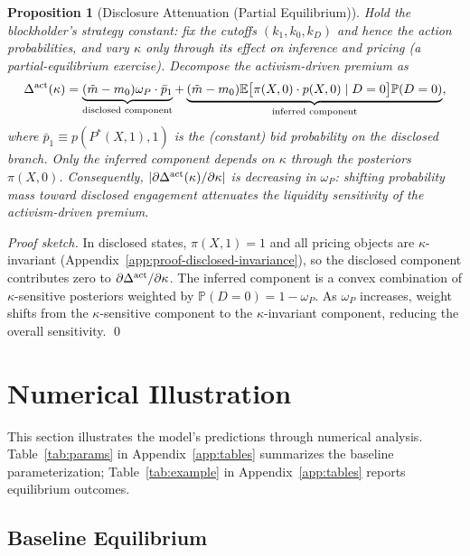 \documentclass[11pt]{article}
\newtheorem{proposition}{Proposition}
\newcommand{\E}{\mathbb{E}}
\newcommand{\PP}{\mathbb{P}}
\newcommand{\1}{\mathbf{1}}
\begin{document}
\begin{proposition}[Disclosure Attenuation (Partial Equilibrium)]
\label{prop:disclosure-attenuation}
Hold the blockholder's strategy constant: fix the cutoffs $(k_1,k_0,k_D)$ and hence the action probabilities, and vary $\kappa$ only through its effect on inference and pricing (a partial-equilibrium exercise). Decompose the activism-driven premium as
\[
\Delta^{\textup{act}}(\kappa) = \underbrace{(\tilde{m}-m_0)\omega_P \cdot \bar{p}_1}_{\text{disclosed component}} + \underbrace{(\tilde{m}-m_0)\E\big[\pi(X,0)\cdot p(X,0) \mid D=0\big]\PP(D=0)}_{\text{inferred component}},
\]
where $\bar{p}_1 \equiv p(P^*(X,1),1)$ is the (constant) bid probability on the disclosed branch. Only the inferred component depends on $\kappa$ through the posteriors $\pi(X,0)$. Consequently, $|\partial \Delta^{\textup{act}}(\kappa)/\partial\kappa|$ is decreasing in $\omega_P$: shifting probability mass toward disclosed engagement attenuates the liquidity sensitivity of the activism-driven premium.
\end{proposition}

\textit{Proof sketch.} In disclosed states, $\pi(X,1)=1$ and all pricing objects are $\kappa$-invariant (Appendix~\ref{app:proof-disclosed-invariance}), so the disclosed component contributes zero to $\partial\Delta^{\textup{act}}/\partial\kappa$. The inferred component is a convex combination of $\kappa$-sensitive posteriors weighted by $\PP(D=0)=1-\omega_P$. As $\omega_P$ increases, weight shifts from the $\kappa$-sensitive component to the $\kappa$-invariant component, reducing the overall sensitivity. \qed

\section{Numerical Illustration}
\label{sec:numerical}

This section illustrates the model's predictions through numerical analysis. Table~\ref{tab:params} in Appendix~\ref{app:tables} summarizes the baseline parameterization; Table~\ref{tab:example} in Appendix~\ref{app:tables} reports equilibrium outcomes.

\subsection{Baseline Equilibrium}
\end{document}
